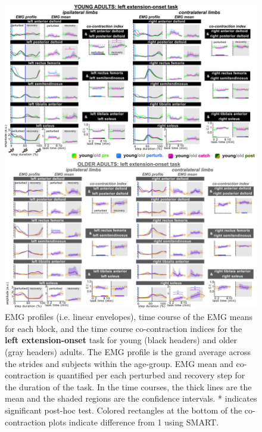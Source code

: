 \documentclass[../thesis_seyed.tex]{subfiles}
\begin{document}
\begin{figure}[H]
    \centering
    \includegraphics[scale=.8]{../img/03_LEI-EMG-CoCont.jpg}
    \caption{EMG profiles (i.e. linear envelopes), time course of the EMG means for each block, and the time course co-contraction indices for the \textbf{left extension-onset} task for young (black headers) and older (gray headers) adults. The EMG profile is the grand average across the strides and subjects within the age-group. EMG mean and co-contraction is quantified per each perturbed and recovery step for the duration of the task.  In the time courses, the thick lines are the mean and the shaded regions are the confidence intervals. * indicates significant post-hoc test. Colored rectangles at the bottom of the co-contraction plots indicate difference from 1 using SMART.}
    \label{fig:LEIEMG}
\end{figure}
\end{document}
